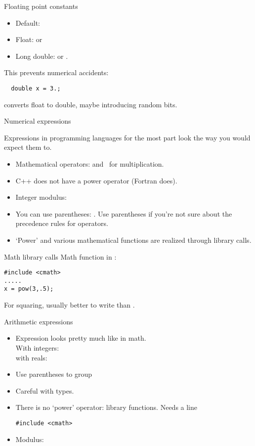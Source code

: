 \begin{block}{Floating point constants}
  \label{sl:float-vars}
  \begin{itemize}
  \item Default: 
  \item Float:  or 
  \item Long double:  or .
  \end{itemize}
  This prevents numerical accidents: 
\begin{lstlisting}
  double x = 3.;
\end{lstlisting}
  converts float to double, maybe introducing random bits.
\end{block}

 {Numerical expressions}

Expressions in
programming languages for the most part look the way you would expect
them to.
\begin{itemize}
\item Mathematical operators: \n{+ - /} and \n{*}~for multiplication.
\item C++ does not have a power operator (Fortran does).
\item Integer modulus:~
\item You can use parentheses: . Use parentheses if you're
  not sure about the precedence rules for operators.
\item `Power' and various mathematical functions are realized through
  library calls.
\end{itemize}

\begin{block}{Math library calls}
  \label{sl:cmath}
  Math function in :
\begin{lstlisting}
#include <cmath>
.....
x = pow(3,.5);
\end{lstlisting}
For squaring, usually better to write  than .
\end{block}

\begin{slide}{Arithmetic expressions}
  \label{sl:arith-expr}
  \begin{itemize}
  \item
    Expression looks pretty much like in math.\\
    With integers: \\
    with reals: 
  \item Use parentheses to group 
  \item Careful with types.
  \item There is no `power' operator: library functions. Needs a line
\begin{lstlisting}
#include <cmath>
\end{lstlisting}
  \item Modulus: 
  \end{itemize}
\end{slide}

